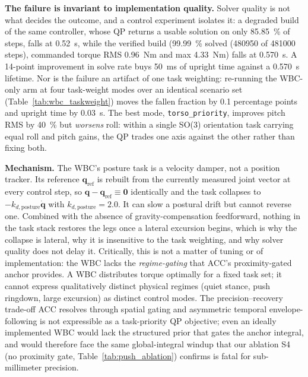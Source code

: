 \documentclass[a4paper,fleqn]{cas-dc}
\begin{document}
\medskip\noindent\textbf{The failure is invariant to implementation quality.}
Solver quality is not what decides the outcome, and a control experiment isolates it: a degraded build of the same controller, whose QP returns a usable solution on only \SI{85.85}{\percent} of steps, falls at \SI{0.52}{s}, while the verified build (\SI{99.99}{\percent} solved (\num{480950} of \num{481000} steps), commanded torque RMS \SI{0.96}{Nm} and max \SI{4.33}{Nm}) falls at \SI{0.570}{s}.
A \num{14}-point improvement in solve rate buys \SI{50}{ms} of upright time against a \SI{0.570}{s} lifetime.
Nor is the failure an artifact of one task weighting: re-running the WBC-only arm at four task-weight modes over an identical scenario set (Table~\ref{tab:wbc_taskweight}) moves the fallen fraction by \num{0.1} percentage points and upright time by \SI{0.03}{s}.
The best mode, \texttt{torso\_priority}, improves pitch RMS by \SI{40}{\percent} but \emph{worsens} roll: within a single SO(3) orientation task carrying equal roll and pitch gains, the QP trades one axis against the other rather than fixing both.

\medskip\noindent\textbf{Mechanism.}
The WBC's posture task is a velocity damper, not a position tracker.
Its reference $\mathbf{q}_{\text{ref}}$ is rebuilt from the currently measured joint vector at every control step, so $\mathbf{q}-\mathbf{q}_{\text{ref}} \equiv \mathbf{0}$ identically and the task collapses to $-k_{d,\text{posture}}\dot{\mathbf{q}}$ with $k_{d,\text{posture}}{=}2.0$.
It can slow a postural drift but cannot reverse one.
Combined with the absence of gravity-compensation feedforward, nothing in the task stack restores the legs once a lateral excursion begins, which is why the collapse is lateral, why it is insensitive to the task weighting, and why solver quality does not delay it.
Critically, this is not a matter of tuning or of implementation: the WBC lacks the \emph{regime-gating} that ACC's proximity-gated anchor provides.
A WBC distributes torque optimally for a fixed task set; it cannot express qualitatively distinct physical regimes (quiet stance, push ringdown, large excursion) as distinct control modes.
The precision--recovery trade-off ACC resolves through spatial gating and asymmetric temporal envelope-following is not expressible as a task-priority QP objective; even an ideally implemented WBC would lack the structured prior that gates the anchor integral, and would therefore face the same global-integral windup that our ablation S4 (no proximity gate, Table~\ref{tab:push_ablation}) confirms is fatal for sub-millimeter precision.
\end{document}

